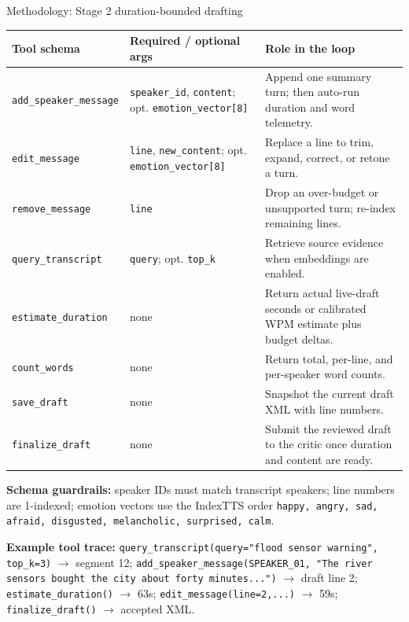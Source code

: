 \documentclass[aspectratio=169,10pt]{beamer}
\begin{document}
\begin{frame}{Methodology: Stage 2 duration-bounded drafting}
\vspace{0.15em}
\begin{adjustbox}{max totalsize={\textwidth}{2.95cm}}
\begin{minipage}{\textwidth}
{\fontsize{5.1}{5.65}\selectfont
\setlength{\tabcolsep}{1.5pt}
\renewcommand{\arraystretch}{1.08}
\begin{tabularx}{\linewidth}{p{2.05cm}p{2.8cm}Y}
\toprule
Tool schema & Required / optional args & Role in the loop \\
\midrule
\texttt{add\_speaker\_message} & \texttt{speaker\_id}, \texttt{content}; opt. \texttt{emotion\_vector[8]} & Append one summary turn; then auto-run duration and word telemetry. \\
\texttt{edit\_message} & \texttt{line}, \texttt{new\_content}; opt. \texttt{emotion\_vector[8]} & Replace a line to trim, expand, correct, or retone a turn. \\
\texttt{remove\_message} & \texttt{line} & Drop an over-budget or unsupported turn; re-index remaining lines. \\
\texttt{query\_transcript} & \texttt{query}; opt. \texttt{top\_k} & Retrieve source evidence when embeddings are enabled. \\
\texttt{estimate\_duration} & none & Return actual live-draft seconds or calibrated WPM estimate plus budget deltas. \\
\texttt{count\_words} & none & Return total, per-line, and per-speaker word counts. \\
\texttt{save\_draft} & none & Snapshot the current draft XML with line numbers. \\
\texttt{finalize\_draft} & none & Submit the reviewed draft to the critic once duration and content are ready. \\
\bottomrule
\end{tabularx}
}
\end{minipage}
\end{adjustbox}
\vspace{0.1em}
{\fontsize{5.7}{6.3}\selectfont\textbf{Schema guardrails:} speaker IDs must match transcript speakers; line numbers are 1-indexed; emotion vectors use the IndexTTS order \texttt{happy, angry, sad, afraid, disgusted, melancholic, surprised, calm}.}
\vspace{0.05em}

{\fontsize{5.5}{6.05}\selectfont\textbf{Example tool trace:} \texttt{query\_transcript(query="flood sensor warning", top\_k=3)} $\rightarrow$ segment 12; \texttt{add\_speaker\_message(SPEAKER\_01, "The river sensors bought the city about forty minutes...")} $\rightarrow$ draft line 2; \texttt{estimate\_duration()} $\rightarrow$ 63s; \texttt{edit\_message(line=2,...)} $\rightarrow$ 59s; \texttt{finalize\_draft()} $\rightarrow$ accepted XML.}
\end{frame}
\end{document}
